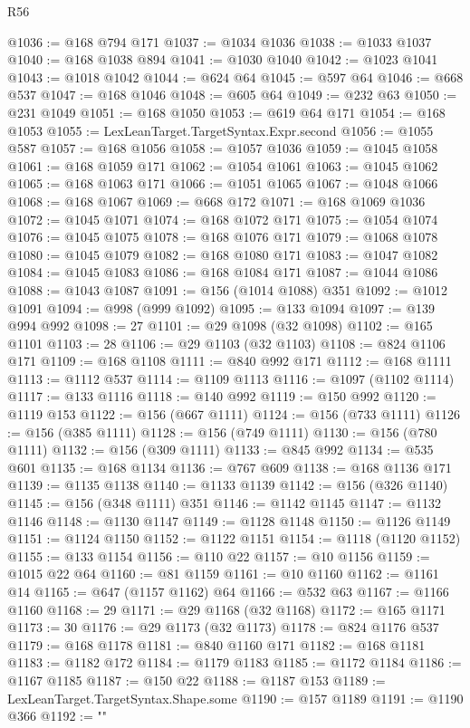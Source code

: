 \begin{lexlean}{R56}
\begin{coremodule}
{{{{{{{{{{{{{{{{{{{{{{{{{{{{{{{{{{{{{{{{{{{{{{{{{{{{{{{{{{{{{{{{{{{{{{{{{{{{{{{{{{{{{{{{{{{{{{{{{{{{{{{{{{{{{{{{{{{{{{{{{{{{{{{{{{{{{{{{{{{{{{{{{{{{{{{{{{{{{{{{{{{{{{{{{{{{{{{{{{{{{{{{{{{{{{{{{{{{{{{{{{{{{{{{{{{@1036 := @168 @794 @171
@1037 := @1034 @1036
@1038 := @1033 @1037
@1040 := @168 @1038 @894
@1041 := @1030 @1040
@1042 := @1023 @1041
@1043 := @1018 @1042
@1044 := @624 @64
@1045 := @597 @64
@1046 := @668 @537
@1047 := @168 @1046
@1048 := @605 @64
@1049 := @232 @63
@1050 := @231 @1049
@1051 := @168 @1050
@1053 := @619 @64 @171
@1054 := @168 @1053
@1055 := LexLeanTarget.TargetSyntax.Expr.second
@1056 := @1055 @587
@1057 := @168 @1056
@1058 := @1057 @1036
@1059 := @1045 @1058
@1061 := @168 @1059 @171
@1062 := @1054 @1061
@1063 := @1045 @1062
@1065 := @168 @1063 @171
@1066 := @1051 @1065
@1067 := @1048 @1066
@1068 := @168 @1067
@1069 := @668 @172
@1071 := @168 @1069 @1036
@1072 := @1045 @1071
@1074 := @168 @1072 @171
@1075 := @1054 @1074
@1076 := @1045 @1075
@1078 := @168 @1076 @171
@1079 := @1068 @1078
@1080 := @1045 @1079
@1082 := @168 @1080 @171
@1083 := @1047 @1082
@1084 := @1045 @1083
@1086 := @168 @1084 @171
@1087 := @1044 @1086
@1088 := @1043 @1087
@1091 := @156 (@1014 @1088) @351
@1092 := @1012 @1091
@1094 := @998 (@999 @1092)
@1095 := @133 @1094
@1097 := @139 @994 @992
@1098 := 27
@1101 := @29 @1098 (@32 @1098)
@1102 := @165 @1101
@1103 := 28
@1106 := @29 @1103 (@32 @1103)
@1108 := @824 @1106 @171
@1109 := @168 @1108
@1111 := @840 @992 @171
@1112 := @168 @1111
@1113 := @1112 @537
@1114 := @1109 @1113
@1116 := @1097 (@1102 @1114)
@1117 := @133 @1116
@1118 := @140 @992
@1119 := @150 @992
@1120 := @1119 @153
@1122 := @156 (@667 @1111)
@1124 := @156 (@733 @1111)
@1126 := @156 (@385 @1111)
@1128 := @156 (@749 @1111)
@1130 := @156 (@780 @1111)
@1132 := @156 (@309 @1111)
@1133 := @845 @992
@1134 := @535 @601
@1135 := @168 @1134
@1136 := @767 @609
@1138 := @168 @1136 @171
@1139 := @1135 @1138
@1140 := @1133 @1139
@1142 := @156 (@326 @1140)
@1145 := @156 (@348 @1111) @351
@1146 := @1142 @1145
@1147 := @1132 @1146
@1148 := @1130 @1147
@1149 := @1128 @1148
@1150 := @1126 @1149
@1151 := @1124 @1150
@1152 := @1122 @1151
@1154 := @1118 (@1120 @1152)
@1155 := @133 @1154
@1156 := @110 @22
@1157 := @10 @1156
@1159 := @1015 @22 @64
@1160 := @81 @1159
@1161 := @10 @1160
@1162 := @1161 @14
@1165 := @647 (@1157 @1162) @64
@1166 := @532 @63
@1167 := @1166 @1160
@1168 := 29
@1171 := @29 @1168 (@32 @1168)
@1172 := @165 @1171
@1173 := 30
@1176 := @29 @1173 (@32 @1173)
@1178 := @824 @1176 @537
@1179 := @168 @1178
@1181 := @840 @1160 @171
@1182 := @168 @1181
@1183 := @1182 @172
@1184 := @1179 @1183
@1185 := @1172 @1184
@1186 := @1167 @1185
@1187 := @150 @22
@1188 := @1187 @153
@1189 := LexLeanTarget.TargetSyntax.Shape.some
@1190 := @157 @1189
@1191 := @1190 @366
@1192 := "{"
}}}}}}}}}}}}}}}}}}}}}}}}}}}}}}}}}}}}}}}}}}}}}}}}}}}}}}}}}}}}}}}}}}}}}}}}}}}}}}}}}}}}}}}}}}}}}}}}}}}}}}}}}}}}}}}}}}}}}}}}}}}}}}}}}}}}}}}}}}}}}}}}}}}}}}}}}}}}}}}}}}}}}}}}}}}}}}}}}}}}}}}}}}}}}}}}}}}}}}}}}}}}}}}}}}}}
\end{coremodule}
\end{lexlean}
